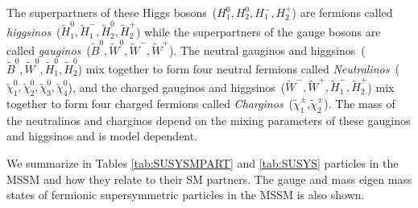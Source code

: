 \vspace{10mm}

\clearpage

The superpartners of these Higgs bosons~($H^{0}_{1}, H^{0}_{2}, H^{-}_{1}, H^{+}_{2}$) are fermions called \textit{higgsinos}~($\tilde{H}^{0}_{1}, \tilde{H}^{-}_{1}, \tilde{H}^{0}_{2},\tilde{H}^{+}_{2}$) while the superpartners of the gauge bosons are called \textit{gauginos}~($\tilde{B}^{0},\tilde{W}^{0},\tilde{W}^{-},\tilde{W}^{+}$). 
The neutral gauginos and higgsinos~($\tilde{B}^{0},\tilde{W}^{0},\tilde{H}^{0}_{1},\tilde{H}^{0}_{2}$) mix together to form four neutral fermions called \textit{Neutralinos}~($\tilde{\chi}^{0}_{1},\tilde{\chi}^{0}_{2},\tilde{\chi}^{0}_{3},\tilde{\chi}^{0}_{4}$), and the charged gauginos and higgsinos~($\tilde{W}^{-},\tilde{W}^{+},\tilde{H}^{-}_{1},\tilde{H}^{+}_{2}$) mix together to form four charged fermions called \textit{Charginos}~($\tilde{\chi}^{\pm}_{1}$,$\tilde{\chi}^{\pm}_{2}$). The mass of the neutralinos and charginos depend on the mixing parameters of these gauginos and higgsinos and is model dependent.

We summarize in Tables \ref{tab:SUSYSMPART} and \ref{tab:SUSYS} particles in the MSSM and how they relate to their SM partners. The gauge and mass eigen mass states of fermionic supersymmetric particles in the MSSM is also shown.



